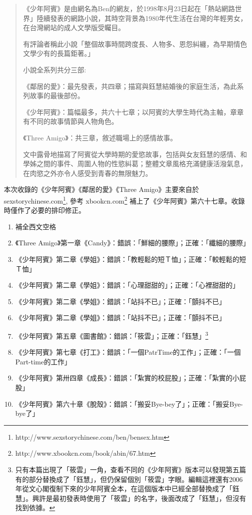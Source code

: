 
\begin{quotation}
    《少年阿賓》是由網名為Ben的網友，於1998年8月23日起在「熱站網路世界」陸續發表的網路小說，其時空背景為1980年代生活在台灣的年輕男女，在台灣網站的成人文學版受矚目。

有評論者稱此小說「整個故事時間跨度長、人物多、恩怨糾纏，為早期情色文學少有的長篇鉅著。」

小說全系列共分三部:

《鄰居的愛》：最先發表，共四章；描寫與鈺慧結婚後的家庭生活，為此系列故事的最後部份。

《少年阿賓》：篇幅最多，共六十七章；以阿賓的大學生時代為主軸，章章有不同的故事情節與人物角色。

《Three Amigo》：共三章，敘述職場上的感情故事。

文中露骨地描寫了阿賓從大學時期的愛慾故事，包括與女友鈺慧的感情、和學姊之間的事件、周圍人物的性慾糾葛；整體文章風格充滿健康活潑氣息，在肉慾之外亦令人感受到青春的無限魅力。

\end{quotation}

本次收錄的《少年阿賓》《鄰居的愛》《Three Amigo》主要來自於sexstorychinese.com\footnote{http://www.sexstorychinese.com/ben/bensex.htm}, 參考 xbookcn.com\footnote{http://www.xbookcn.com/book/abin/67.htm} 補上了《少年阿賓》第六十七章。收錄時僅作了必要的排印修正。

\begin{enumerate}
\item 補全西文空格
\item 《Three Amigo》第一章《Candy》：錯誤：「鮮細的腰際」；正確：「纖細的腰際」
\item 《少年阿賓》第二章《學姐》：錯誤：「教輕鬆的短Ｔ恤」；正確：「較輕鬆的短Ｔ恤」
\item 《少年阿賓》第二章《學姐》：錯誤：「心理甜甜的」；正確：「心裡甜甜的」
\item 《少年阿賓》第二章《學姐》：錯誤：「站抖不已」；正確：「顫抖不已」
\item 《少年阿賓》第二章《學姐》：錯誤：「站抖不已」；正確：「顫抖不已」
\item 《少年阿賓》第五章《圖書館》：錯誤：「筱雲」；正確：「鈺慧」\footnote{只有本篇出現了「筱雲」一角，查看不同的《少年阿賓》版本可以發現第五篇有的部分替換成了「鈺慧」，但仍保留個別「筱雲」字眼。編輯這裡還有2006年從文心閣復制下來的少年阿賓全本，在這個版本中已經全部替換成了「鈺慧」。興許是最初發表時使用了「筱雲」的名字，後面改成了「鈺慧」，但沒有找到依據。}
\item 《少年阿賓》第七章《打工》：錯誤：「一個PatrTime的工作」；正確：「一個Part-time的工作」
\item 《少年阿賓》第卅四章《成長》：錯誤：「紮實的校屁股」；正確：「紮實的小屁股」
\item 《少年阿賓》第六十章《脫殼》：錯誤：「搬妥Bye-bey了」；正確：「搬妥Bye-bye了」
\end{enumerate}
